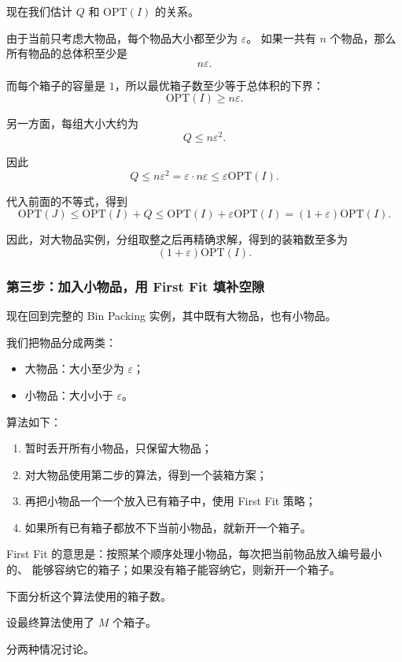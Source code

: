 \documentclass[UTF8,openany,12pt]{ctexbook}
\theoremstyle{remark}
\newcommand{\OPT}{\mathrm{OPT}}
\begin{document}
现在我们估计 $Q$ 和 $\OPT(I)$ 的关系。

由于当前只考虑大物品，每个物品大小都至少为 $\varepsilon$。
如果一共有 $n$ 个物品，那么所有物品的总体积至少是
\[
  n\varepsilon.
\]

而每个箱子的容量是 $1$，所以最优箱子数至少等于总体积的下界：
\[
  \OPT(I)\ge n\varepsilon.
\]

另一方面，每组大小大约为
\[
  Q\le n\varepsilon^2.
\]

因此
\[
  Q\le n\varepsilon^2
    = \varepsilon\cdot n\varepsilon
    \le \varepsilon\OPT(I).
\]

代入前面的不等式，得到
\[
  \OPT(J)
  \le \OPT(I)+Q
  \le \OPT(I)+\varepsilon\OPT(I)
  = (1+\varepsilon)\OPT(I).
\]

因此，对大物品实例，分组取整之后再精确求解，得到的装箱数至多为
\[
  (1+\varepsilon)\OPT(I).
\]

\subsubsection*{第三步：加入小物品，用 First Fit 填补空隙}

现在回到完整的 Bin Packing 实例，其中既有大物品，也有小物品。

我们把物品分成两类：

\begin{itemize}
  \item 大物品：大小至少为 $\varepsilon$；
  \item 小物品：大小小于 $\varepsilon$。
\end{itemize}

算法如下：

\begin{enumerate}
  \item 暂时丢开所有小物品，只保留大物品；
  \item 对大物品使用第二步的算法，得到一个装箱方案；
  \item 再把小物品一个一个放入已有箱子中，使用 First Fit 策略；
  \item 如果所有已有箱子都放不下当前小物品，就新开一个箱子。
\end{enumerate}

First Fit 的意思是：按照某个顺序处理小物品，每次把当前物品放入编号最小的、
能够容纳它的箱子；如果没有箱子能容纳它，则新开一个箱子。

下面分析这个算法使用的箱子数。

设最终算法使用了 $M$ 个箱子。

分两种情况讨论。
\end{document}
